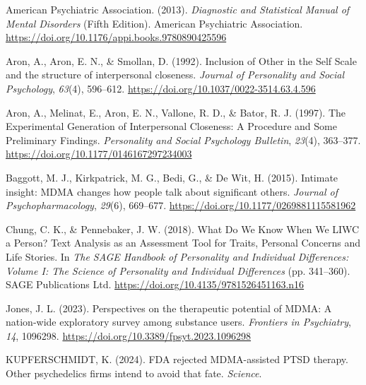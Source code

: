 \documentclass[
  man,
  longtable,
  nolmodern,
  notxfonts,
  notimes,
  colorlinks=true,linkcolor=blue,citecolor=blue,urlcolor=blue]{apa7}
\newlength{\cslhangindent}
\newenvironment{CSLReferences}[2] %
 {\begin{list}{}{%
  \setlength{\itemindent}{0pt}
  \setlength{\leftmargin}{0pt}
  \setlength{\parsep}{0pt}
  \ifodd #1
   \setlength{\leftmargin}{\cslhangindent}
   \setlength{\itemindent}{-1\cslhangindent}
  \fi
  \setlength{\itemsep}{#2\baselineskip}}}
 {\end{list}}
\begin{document}
\label{refs}
\begin{CSLReferences}{1}{0}
American Psychiatric Association. (2013). \emph{Diagnostic and
{Statistical Manual} of {Mental Disorders}} (Fifth Edition). American
Psychiatric Association.
\url{https://doi.org/10.1176/appi.books.9780890425596}

Aron, A., Aron, E. N., \& Smollan, D. (1992). Inclusion of {Other} in
the {Self Scale} and the structure of interpersonal closeness.
\emph{Journal of Personality and Social Psychology}, \emph{63}(4),
596--612. \url{https://doi.org/10.1037/0022-3514.63.4.596}

Aron, A., Melinat, E., Aron, E. N., Vallone, R. D., \& Bator, R. J.
(1997). The {Experimental Generation} of {Interpersonal Closeness}: {A
Procedure} and {Some Preliminary Findings}. \emph{Personality and Social
Psychology Bulletin}, \emph{23}(4), 363--377.
\url{https://doi.org/10.1177/0146167297234003}

Baggott, M. J., Kirkpatrick, M. G., Bedi, G., \& De Wit, H. (2015).
Intimate insight: {MDMA} changes how people talk about significant
others. \emph{Journal of Psychopharmacology}, \emph{29}(6), 669--677.
\url{https://doi.org/10.1177/0269881115581962}

Chung, C. K., \& Pennebaker, J. W. (2018). What {Do We Know When We
LIWC} a {Person}? {Text Analysis} as an {Assessment Tool} for {Traits},
{Personal Concerns} and {Life Stories}. In \emph{The {SAGE Handbook} of
{Personality} and {Individual Differences}: {Volume I}: {The Science} of
{Personality} and {Individual} {Differences}} (pp. 341--360). SAGE
Publications Ltd. \url{https://doi.org/10.4135/9781526451163.n16}

Jones, J. L. (2023). Perspectives on the therapeutic potential of
{MDMA}: {A} nation-wide exploratory survey among substance users.
\emph{Frontiers in Psychiatry}, \emph{14}, 1096298.
\url{https://doi.org/10.3389/fpsyt.2023.1096298}

KUPFERSCHMIDT, K. (2024). {FDA} rejected {MDMA-assisted PTSD} therapy.
{Other} psychedelics firms intend to avoid that fate. \emph{Science}.


\end{CSLReferences}
\end{document}
